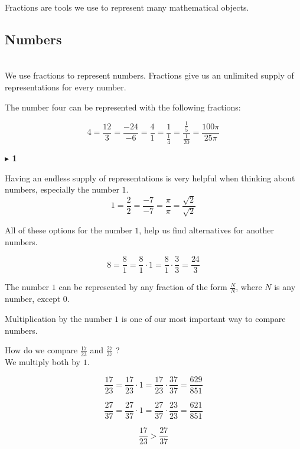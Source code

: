 \documentclass{ximera}
\begin{document}
Fractions are tools we use to represent many mathematical objects.



\subsection*{Numbers} \\



We use fractions to represent numbers.  Fractions give us an unlimited supply of representations for every number.

The number four can be represented with the following fractions:

\[
4 = \frac{12}{3} = \frac{-24}{-6} = \frac{4}{1} = \frac{1}{\tfrac{1}{4}} = \frac{\tfrac{1}{5}}{\tfrac{1}{20}} = \frac{100\pi}{25\pi}
\]








\textbf{\textcolor{purple!85!blue}{$\blacktriangleright$ 1}} 



Having an endless supply of representations is very helpful when thinking about numbers, especially the number $1$. \\


\[
1 = \frac{2}{2} = \frac{-7}{-7} = \frac{\pi}{\pi} = \frac{\sqrt{2}}{\sqrt{2}} 
\]


All of these options for the number $1$, help us find alternatives for another numbers.


\[
8 = \frac{8}{1} = \frac{8}{1} \cdot 1 = \frac{8}{1} \cdot \frac{3}{3} = \frac{24}{3}
\]




\begin{idea}

The number $1$ can be represented by any fraction of the form $\frac{N}{N}$, where $N$ is any number, except $0$.


\end{idea}







Multiplication by the number $1$ is one of our most important way to compare numbers.




\begin{example}

How do we compare $\frac{17}{23}$ and $\frac{27}{37}$ ? \\

We multiply both by $1$.


\[
\frac{17}{23} = \frac{17}{23} \cdot 1 = \frac{17}{23} \cdot \frac{37}{37} = \frac{629}{851}
\]


\[
\frac{27}{37} = \frac{27}{37} \cdot 1 = \frac{27}{37} \cdot \frac{23}{23} = \frac{621}{851}
\]



\[
\frac{17}{23} > \frac{27}{37}
\]


\end{example}
\end{document}
